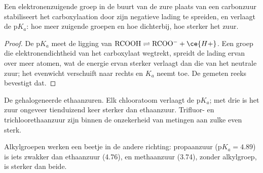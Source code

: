 \begin{proposition}\label{prop:b1:electronic-effects:inductive-pka}
Een elektronenzuigende groep in de buurt van de zure plaats van een
carbonzuur stabiliseert het carboxylaation door zijn negatieve lading te
spreiden, en verlaagt de $\mathrm{p}K_a$: hoe meer zuigende groepen en hoe
dichterbij, hoe sterker het zuur.
\end{proposition}

\begin{proof}
De $\mathrm{p}K_a$ meet de ligging van $\mathrm{RCOOH} \rightleftharpoons
\mathrm{RCOO^-} + \ce{H+}$. Een groep die elektronendichtheid van het
carboxylaat wegtrekt, spreidt de lading ervan over meer atomen, wat de
energie ervan sterker verlaagt dan die van het neutrale zuur; het
evenwicht verschuift naar rechts en $K_a$ neemt toe. De gemeten reeks
bevestigt dat.
\end{proof}

\begin{omfigure}

{\small De gehalogeneerde ethaanzuren. Elk chlooratoom verlaagt de
$\mathrm{p}K_a$; met drie is het zuur ongeveer tienduizend keer sterker
dan ethaanzuur. Trifluor- en trichloorethaanzuur zijn binnen de
onzekerheid van metingen aan zulke  even sterk.}
\end{omfigure}

Alkylgroepen werken een beetje in de andere richting: propaanzuur
($\mathrm{p}K_a
= 4.89$) is iets zwakker dan ethaanzuur (4.76), en methaanzuur (3.74),
zonder alkylgroep, is sterker dan beide.



